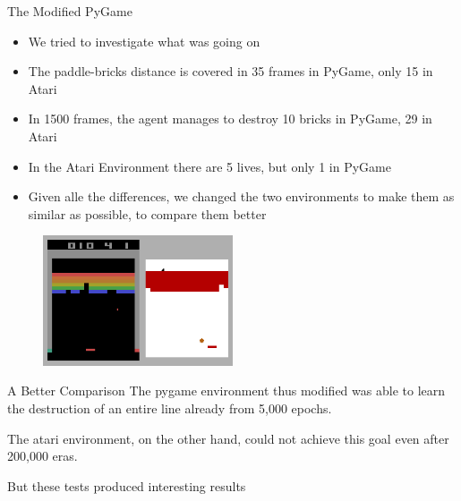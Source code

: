 
\begin{frame}{The Modified PyGame}
    \begin{itemize}
	\item We tried to investigate what was going on
	\item The paddle-bricks distance is covered in 35 frames in PyGame, only 15 in Atari
	\item In 1500 frames, the agent manages to destroy 10 bricks in PyGame, 29 in Atari
	\item In the Atari Environment there are 5 lives, but only 1 in PyGame
	\item Given alle the differences, we changed the two environments to make them as similar as possible, to compare them better
    \end{itemize}
    \begin{figure}
        \includegraphics[width=0.5\textwidth]{images/modified-pygame-comparison.png}
    \end{figure}
\end{frame}

\begin{frame}{A Better Comparison}
The pygame environment thus modified was able to learn the destruction of an entire line already from 5,000 epochs.

\bigskip
The atari environment, on the other hand, could not achieve this goal even after 200,000 eras.

\bigskip
But these tests produced interesting results
\end{frame}

